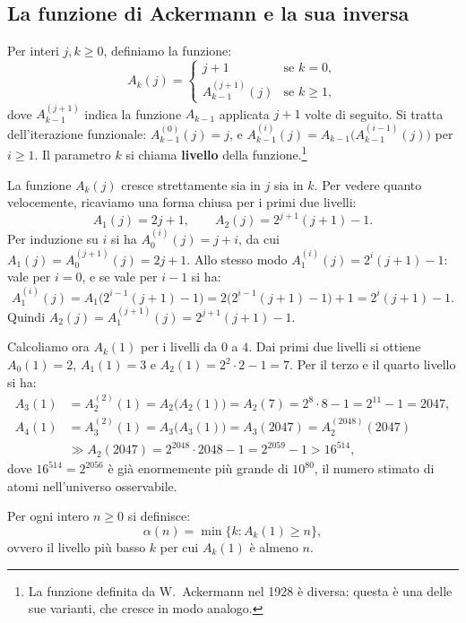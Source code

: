 \subsection{La funzione di Ackermann e la sua inversa}\label{sec:uf-ackermann}
Per interi $j, k \ge 0$, definiamo la funzione:
\[
A_k(j) =
\begin{cases}
j + 1 & \text{se } k = 0, \\
A_{k-1}^{(j+1)}(j) & \text{se } k \ge 1,
\end{cases}
\]
dove $A_{k-1}^{(j+1)}$ indica la funzione $A_{k-1}$ applicata $j + 1$ volte di seguito. Si tratta dell'iterazione funzionale: $A_{k-1}^{(0)}(j) = j$, e $A_{k-1}^{(i)}(j) = A_{k-1}\bigl(A_{k-1}^{(i-1)}(j)\bigr)$ per $i \ge 1$. Il parametro $k$ si chiama \textbf{livello} della funzione.\footnote{La funzione definita da W.~Ackermann nel 1928 \cite{Ackermann1928} è diversa: questa è una delle sue varianti, che cresce in modo analogo.}

La funzione $A_k(j)$ cresce strettamente sia in $j$ sia in $k$. Per vedere quanto velocemente, ricaviamo una forma chiusa per i primi due livelli:
\[
A_1(j) = 2j + 1, \qquad A_2(j) = 2^{j+1}(j + 1) - 1.
\]
Per induzione su $i$ si ha $A_0^{(i)}(j) = j + i$, da cui $A_1(j) = A_0^{(j+1)}(j) = 2j + 1$. Allo stesso modo $A_1^{(i)}(j) = 2^i(j + 1) - 1$: vale per $i = 0$, e se vale per $i - 1$ si ha:
\[
A_1^{(i)}(j) = A_1\bigl(2^{i-1}(j + 1) - 1\bigr) = 2\bigl(2^{i-1}(j + 1) - 1\bigr) + 1 = 2^i(j + 1) - 1.
\]
Quindi $A_2(j) = A_1^{(j+1)}(j) = 2^{j+1}(j + 1) - 1$.

Calcoliamo ora $A_k(1)$ per i livelli da $0$ a $4$. Dai primi due livelli si ottiene $A_0(1) = 2$, $A_1(1) = 3$ e $A_2(1) = 2^2 \cdot 2 - 1 = 7$. Per il terzo e il quarto livello si ha:
\[
\begin{aligned}
A_3(1) &= A_2^{(2)}(1) = A_2\bigl(A_2(1)\bigr) = A_2(7) = 2^8 \cdot 8 - 1 = 2^{11} - 1 = 2047, \\
A_4(1) &= A_3^{(2)}(1) = A_3\bigl(A_3(1)\bigr) = A_3(2047) = A_2^{(2048)}(2047) \\
&\gg A_2(2047) = 2^{2048} \cdot 2048 - 1 = 2^{2059} - 1 > 16^{514},
\end{aligned}
\]
dove $16^{514} = 2^{2056}$ è già enormemente più grande di $10^{80}$, il numero stimato di atomi nell'universo osservabile.

\begin{definizione}\label{def:uf-alpha}
Per ogni intero $n \ge 0$ si definisce:
\[
\alpha(n) = \min\{k : A_k(1) \ge n\},
\]
ovvero il livello più basso $k$ per cui $A_k(1)$ è almeno $n$.
\end{definizione}


